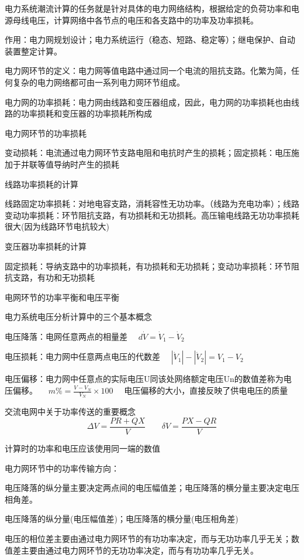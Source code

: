 \documentclass[UTF8, 12pt, a4paper]{ctexart}
\begin{document}
电力系统潮流计算的任务就是针对具体的电力网络结构，根据给定的负荷功率和电源母线电压，计算网络中各节点的电压和各支路中的功率及功率损耗。

作用：电力网规划设计；电力系统运行（稳态、短路、稳定等）；继电保护、自动装置整定计算。

电力网环节的定义：电力网等值电路中通过同一个电流的阻抗支路。化繁为简，任何复杂的电力网络都可由一系列电力网环节组成。

电力网的功率损耗：电力网由线路和变压器组成，因此，电力网的功率损耗也由线路的功率损耗和变压器的功率损耗所构成

电力网环节的功率损耗

变动损耗：电流通过电力网环节支路电阻和电抗时产生的损耗；固定损耗：电压施加于并联等值导纳时产生的损耗

线路功率损耗的计算

线路固定功率损耗：对地电容支路，消耗容性无功功率。（线路为充电功率）；线路变动功率损耗：环节阻抗支路，有功损耗和无功损耗。高压输电线路无功功率损耗很大(因为线路环节电抗较大)

变压器功率损耗的计算

固定损耗：导纳支路中的功率损耗，有功损耗和无功损耗；变动功率损耗：环节阻抗支路，有功和无功损耗

电网环节的功率平衡和电压平衡

电力系统电压分析计算中的三个基本概念

电压降落：电网任意两点的相量差 $\quad d \dot { V } = \dot { V } _ { 1 } - \dot { V } _ { 2 }$

电压损耗：电力网中任意两点电压的代数差 $\quad | \dot { V } _ { 1 } | - |\dot { V } _ { 2 } |= V _ { 1 } - V _ { 2 }$

电压偏移：电力网中任意点的实际电压U同该处网络额定电压Un的数值差称为电压偏移。 $\quad m \% = \frac { V - V _ { N }  } { V _ { N } }\times 100 \quad $ 电压偏移的大小，直接反映了供电电压的质量

交流电网中关于功率传送的重要概念
\[\Delta V = \frac { P R + Q X } { V } \qquad \delta V = \frac { P X - Q R } { V }\]

计算时的功率和电压应该使用同一端的数值

电力网环节中的功率传输方向：

电压降落的纵分量主要决定两点间的电压幅值差；电压降落的横分量主要决定电压相角差。

电压降落的纵分量(电压幅值差)；电压降落的横分量(电压相角差)

电压的相位差主要由通过电力网环节的有功功率决定，而与无功功率几乎无关；数值差主要由通过电力网环节的无功功率决定，而与有功功率几乎无关。
\end{document}
